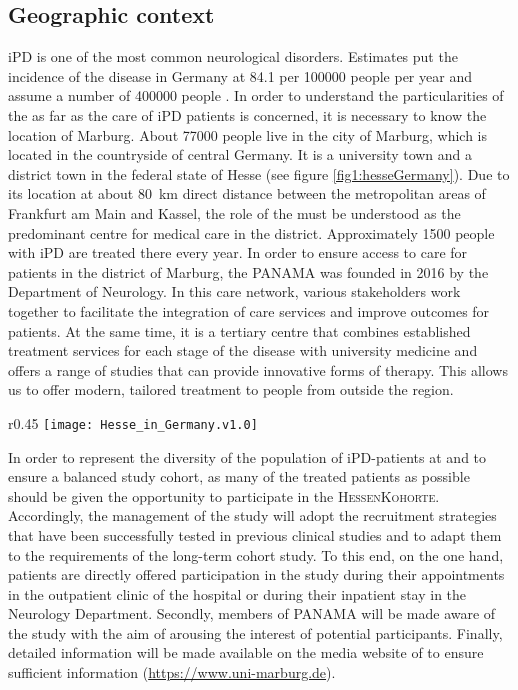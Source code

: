\subsection{Geographic context}
\ac{iPD} is one of the most common neurological disorders. Estimates put the incidence of the disease in Germany at \SI{84.1}{} per \num[round-precision = 0, round-mode = places]{100000}{} people per year and assume a number of \num[round-precision = 0, round-mode = places]{400000}{} people \citep{nerius2017parkinson}. In order to understand the particularities of the \UKM as far as the care of \ac{iPD} patients is concerned, it is necessary to know the location of Marburg. About \SI[round-precision = 0, round-mode=places]{77000}{} people live in the city of Marburg, which is located in the countryside of central Germany. It is a university town and a district town in the federal state of Hesse (see figure \ref{fig1:hesseGermany}). Due to its location at about \SI{80}{\km} direct distance between the metropolitan areas of Frankfurt am Main and Kassel, the role of the \UKM must be understood as the predominant centre for medical care in the district. Approximately \num[round-precision = 0, round-mode = places]{1500}{} people with \ac{iPD} are treated there every year. In order to ensure access to care for patients in the district of Marburg, the \ac{PANAMA} was founded in 2016 by the Department of Neurology. In this care network, various stakeholders work together to facilitate the integration of care services and improve outcomes for patients. At the same time, it is a tertiary centre that combines established treatment services for each stage of the disease with university medicine and offers a range of studies that can provide innovative forms of therapy. This allows us to offer modern, tailored treatment to people from outside the region.

\begin{wrapfigure}{r}{0.45\textwidth}
    \label{fig1:hesseGermany}
    \centering
    \texttt{[image: Hesse\_in\_Germany.v1.0]}
    \caption{Location of Hesse in the German Federal Republic}
\end{wrapfigure}

In order to represent the diversity of the population of \ac{iPD}-patients at \UKM and to ensure a balanced study cohort, as many of the treated patients as possible should be given the opportunity to participate in the \textsc{HessenKohorte}. Accordingly, the management of the study will adopt the recruitment strategies that have been successfully tested in previous clinical studies and to adapt them to the requirements of the long-term cohort study. To this end, on the one hand, patients are directly offered participation in the study during their appointments in the outpatient clinic of the hospital or during their inpatient stay in the Neurology Department. Secondly, members of \ac{PANAMA} will be made aware of the study with the aim of arousing the interest of potential participants. Finally, detailed information will be made available on the media website of \UKM to ensure sufficient information (\url{https://www.uni-marburg.de}).
\newpage


